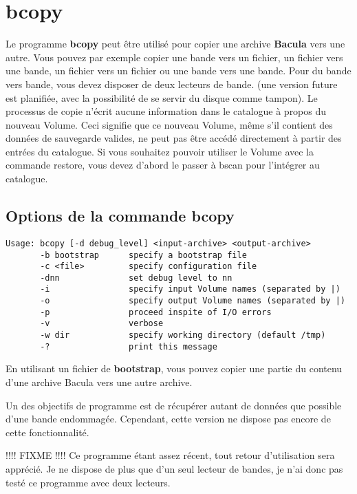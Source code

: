 \section{bcopy}
\label{bcopy}

Le programme {\bf bcopy} peut être utilisé pour copier une archive {\bf Bacula}
vers une autre. Vous pouvez par exemple copier une bande vers un fichier, un
fichier vers une bande, un fichier vers un fichier ou une bande vers une bande.
Pour du bande vers bande, vous devez disposer de deux lecteurs de bande. (une
version future est planifiée, avec la possibilité de se servir du disque comme
tampon). Le processus de copie n'écrit aucune information dans le catalogue à 
propos du nouveau Volume. Ceci signifie que ce nouveau Volume, même s'il
contient des données de sauvegarde valides, ne peut pas être accédé directement
à partir des entrées du catalogue. Si vous souhaitez pouvoir utiliser le Volume
avec la commande restore, vous devez d'abord le passer à bscan pour l'intégrer
au catalogue. 

\subsection{Options de la commande bcopy}

\footnotesize
\begin{verbatim}
Usage: bcopy [-d debug_level] <input-archive> <output-archive>
       -b bootstrap      specify a bootstrap file
       -c <file>         specify configuration file
       -dnn              set debug level to nn
       -i                specify input Volume names (separated by |)
       -o                specify output Volume names (separated by |)
       -p                proceed inspite of I/O errors
       -v                verbose
       -w dir            specify working directory (default /tmp)
       -?                print this message
\end{verbatim}
\normalsize

En utilisant un fichier de {\bf bootstrap}, vous pouvez copier une partie du
contenu d'une archive Bacula vers une autre archive. 

Un des objectifs de programme est de récupérer autant de données que possible
d'une bande endommagée. Cependant, cette version ne dispose pas encore de cette
fonctionnalité.

!!!! FIXME !!!!
Ce programme étant assez récent, tout retour d'utilisation sera apprécié. Je
ne dispose de plus que d'un seul lecteur de bandes, je n'ai donc pas testé
ce programme avec deux lecteurs.

